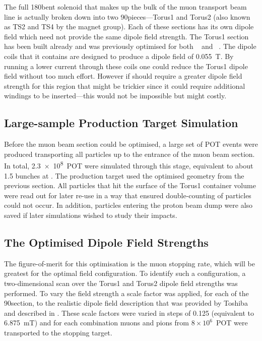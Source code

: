 The full 180\degree bent solenoid that makes up the bulk of the muon transport beam line is actually broken down into two
90\degree pieces---Torus1 and Torus2 (also known as TS2 and TS4 by the magnet group).
Each of these sections has its own dipole field which need not provide the same dipole field strength.
The Torus1 section has been built already and was previously optimised for both \phaseI~\cite{TDR2016} and \phaseII~\cite{CDRphase2}. 
The dipole coils that it contains are designed to produce a dipole field of 0.055~T.
By running a lower current through these coils one could reduce the Torus1 dipole field without too much effort. 
However if \phaseII should require a greater dipole field strength for this region
that might be trickier since it could require additional windings to be inserted---this would not be impossible but might costly.

\subsection{Large-sample Production Target Simulation}
Before the muon beam section could be optimised, a large set of \ac{POT} events were produced transporting all particles up to the entrance of the muon beam section.
In total, \num{2.3e8}~POT were simulated through this stage, equivalent to about 1.5 bunches at \phaseII.
The production target used the optimised geometry from the previous section.
All particles that hit the surface of the Torus1 container volume were read out for later re-use in a way that ensured double-counting of particles could not occur.
In addition, particles entering the proton beam dump were also saved if later simulations wished to study their impacts.

\subsection{The Optimised Dipole Field Strengths}
\FigOptimMuBeamDipoleMuStops
The figure-of-merit for this optimisation is the muon stopping rate, which will be greatest for the optimal field configuration.
To identify such a configuration, a two-dimensional scan over the Torus1 and Torus2 dipole field strengths was performed.
To vary the field strength a scale factor was applied, for each of the 90\degree section, to the realistic dipole field description that was provided by Toshiba and described in .
These scale factors were varied in steps of 0.125 (equivalent to 6.875~mT) and for each combination muons and pions from $8\times10^6$~POT were transported to the stopping target.

